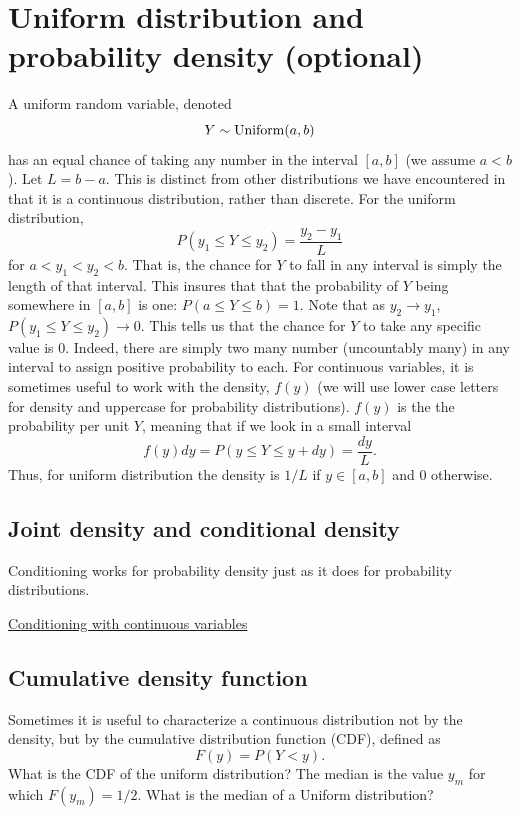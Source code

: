  \section{Uniform distribution and probability density (optional)}
 A uniform random variable, denoted  
 \begin{equation}
 Y \sim {\rm Uniform}(a,b)
 \end{equation}
 has an equal chance of taking any number in the interval $[a,b]$ (we assume $a<b$). Let $L=b-a$. This is distinct from other distributions we have encountered in that it is a {\dfn continuous distribution}, rather than discrete. For the uniform distribution, 
 \begin{equation}
 P(y_1\le Y \le y_2) = \frac{y_2-y_1}{L}
 \end{equation}
 for $a<y_1<y_2<b$. 
 That is, the chance for $Y$ to fall in any interval is simply the length of that interval. This insures that that the probability of $Y$ being somewhere in $[a,b]$ is one: $P(a\le Y\le b) = 1$. Note that as $y_2 \to y_1$, $P(y_1\le Y \le y_2) \to 0$. This tells us that the chance for $Y$ to take any specific value is $0$. Indeed, there are simply two many number (uncountably many) in any interval to assign positive probability to each. For continuous variables, it is sometimes useful to work with the density, $f(y)$ (we will use lower case letters for density and uppercase for probability distributions). $f(y)$ is the the probability per unit $Y$, meaning that if we look in a small interval 
 \begin{equation}
f(y)dy = P(y \le Y \le y+dy) = \frac{dy}{L}.
 \end{equation}
 Thus, for uniform distribution the density is $1/L$ if $y \in [a,b]$ and $0$ otherwise. 
 
 \subsection{Joint density and conditional density}
 
 Conditioning works for probability density just as it does for probability distributions. 
 
 \begin{example}
\href{https://colab.research.google.com/drive/1PPFwE4GUzsr707s3mPhGRs7-TYlHxND2#scrollTo=4X_DE6Ny_mcE}{Conditioning with continuous variables} 
 \end{example}
 
 \subsection{Cumulative density function}
Sometimes it is useful to characterize a continuous distribution not by the density, but by the {\dfn cumulative distribution function (CDF)}, defined as 
\begin{equation}
F(y) = P(Y<y).
\end{equation}
What is the CDF of the uniform distribution? The {\dfn median} is the value $y_m$ for which $F(y_m) = 1/2$. What is the median of a Uniform distribution?  
  
